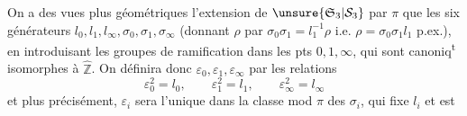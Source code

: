 On a des vues plus géométriques   l'extension de $\unsure{\mathfrak S_3|\mathcal S_3}$ par $\pi$  que les six générateurs $l_0,l_1,l_\infty,\sigma_0,\sigma_1,\sigma_\infty$ (donnant $\rho$ par $\sigma_0\sigma_1=l_1^{-1}\rho$  i.e. $\rho=\sigma_0\sigma_1l_1$ p.ex.), en introduisant les groupes de ramification dans les pts $0,1,\infty$, qui sont canoniq\textsuperscript{t} isomorphes à $\widehat{\mathbb Z}$.
On définira donc $\varepsilon_0,\varepsilon_1,\varepsilon_\infty$ par les relations
\[
\varepsilon_0^2=l_0,\qquad\varepsilon_1^2=l_1,\qquad\varepsilon_\infty^2=l_\infty
\]
et plus précisément, $\varepsilon_i$ sera l'unique   dans la classe mod $\pi$ des $\sigma_i$,  qui fixe $l_i$ et est  

